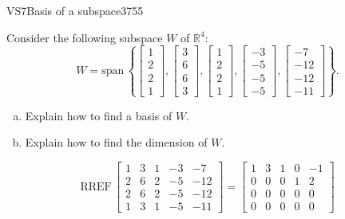 \begin{exercise}{VS7}{Basis of a subspace}{3755} 
\begin{exerciseStatement} 

 Consider the following subspace \(W\) of \(\mathbb R^4\): \[W=\mathrm{span}\,\left\{ \left[\begin{array}{c}
1 \\
2 \\
2 \\
1
\end{array}\right] , \left[\begin{array}{c}
3 \\
6 \\
6 \\
3
\end{array}\right] , \left[\begin{array}{c}
1 \\
2 \\
2 \\
1
\end{array}\right] , \left[\begin{array}{c}
-3 \\
-5 \\
-5 \\
-5
\end{array}\right] , \left[\begin{array}{c}
-7 \\
-12 \\
-12 \\
-11
\end{array}\right] \right\}.\] 

 

\begin{enumerate}[(a)]
\item 

Explain how to find a basis of \(W\).


\item 

Explain how to find the dimension of \(W\).


\end{enumerate}

     \end{exerciseStatement}
 \begin{exerciseAnswer} 

\[\mathrm{RREF}\,\left[\begin{array}{ccccc}
1 & 3 & 1 & -3 & -7 \\
2 & 6 & 2 & -5 & -12 \\
2 & 6 & 2 & -5 & -12 \\
1 & 3 & 1 & -5 & -11
\end{array}\right]=\left[\begin{array}{ccccc}
1 & 3 & 1 & 0 & -1 \\
0 & 0 & 0 & 1 & 2 \\
0 & 0 & 0 & 0 & 0 \\
0 & 0 & 0 & 0 & 0
\end{array}\right]\]


\end{exerciseAnswer}
\end{exercise}

